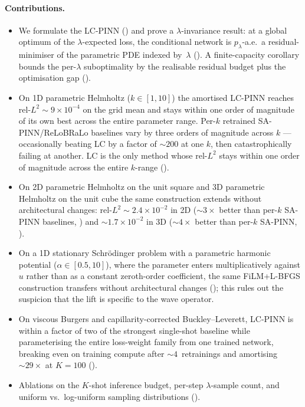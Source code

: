\documentclass{article}
\theoremstyle{plain}
\theoremstyle{definition}
\theoremstyle{remark}
\begin{document}
\paragraph{Contributions.}
\begin{itemize}\setlength{\itemsep}{0pt}
   \item We formulate the LC-PINN
         () and prove a
         $\lambda$-invariance result: at a global optimum of the
         $\lambda$-expected loss, the conditional network is
         $p_\lambda$-a.e.\ a residual-minimiser of the parametric
         PDE indexed by~$\lambda$ (). A
         finite-capacity corollary bounds the per-$\lambda$
         suboptimality by the realisable residual budget plus the
         optimisation gap ().
   \item On 1D parametric Helmholtz ($k \!\in\! [1, 10]$) the
         amortised LC-PINN reaches rel-$L^2 \!\sim\! 9\!\times\!10^{-4}$
         on the grid mean and stays within one order of magnitude of
         its own best across the entire parameter range. Per-$k$
         retrained SA-PINN/ReLoBRaLo baselines vary by three orders of
         magnitude across $k$ --- occasionally beating LC by a factor
         of $\sim\!200$ at one $k$, then catastrophically failing at
         another. LC is the only method whose rel-$L^2$ stays within
         one order of magnitude across the entire $k$-range
         ().
   \item On 2D parametric Helmholtz on the unit square and 3D
         parametric Helmholtz on the unit cube the same construction
         extends without architectural changes: rel-$L^2 \!\sim\!
         2.4\!\times\!10^{-2}$ in 2D ($\sim\!3\times$ better than
         per-$k$ SA-PINN baselines, )
         and $\sim\!1.7\!\times\!10^{-2}$ in 3D ($\sim\!4\times$
         better than per-$k$ SA-PINN, ).
   \item On a 1D stationary Schrödinger problem with a parametric
         harmonic potential ($\alpha \!\in\! [0.5, 10]$), where the
         parameter enters multiplicatively against $u$ rather than as
         a constant zeroth-order coefficient, the same FiLM+L-BFGS
         construction transfers without architectural changes
         (); this rules out the
         suspicion that the lift is specific to the wave operator.
   \item On viscous Burgers and capillarity-corrected
         Buckley--Leverett, LC-PINN is within a factor of two of
         the strongest single-shot baseline while parameterising
         the entire loss-weight family from one trained network,
         breaking even on training compute after
         $\sim\!4$~retrainings and amortising $\sim\!29\times$ at
         $K\!=\!100$ ().
   \item Ablations on the $K$-shot inference budget, per-step
         $\lambda$-sample count, and uniform vs.\ log-uniform
         sampling distributions ().
\end{itemize}
\end{document}
